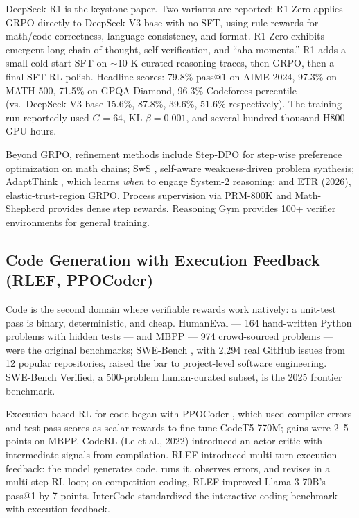 \documentclass{article}
\begin{document}
DeepSeek-R1 \citep{guo20252025} is the keystone paper. Two variants are reported: R1-Zero applies GRPO directly to DeepSeek-V3 base with no SFT, using rule rewards for math/code correctness, language-consistency, and format. R1-Zero exhibits emergent long chain-of-thought, self-verification, and ``aha moments.'' R1 adds a small cold-start SFT on $\sim$10 K curated reasoning traces, then GRPO, then a final SFT-RL polish. Headline scores: 79.8\% pass@1 on AIME 2024, 97.3\% on MATH-500, 71.5\% on GPQA-Diamond, 96.3\% Codeforces percentile (vs.~DeepSeek-V3-base 15.6\%, 87.8\%, 39.6\%, 51.6\% respectively). The training run reportedly used \(G = 64\), KL \(\beta = 0.001\), and several hundred thousand H800 GPU-hours.

Beyond GRPO, refinement methods include Step-DPO \citep{lai20242024} for step-wise preference optimization on math chains; SwS \citep{liang20252025}, self-aware weakness-driven problem synthesis; AdaptThink \citep{zhang20252025}, which learns \emph{when} to engage System-2 reasoning; and ETR (2026), elastic-trust-region GRPO. Process supervision via PRM-800K \citep{lightman2023letsverifystepbyst} and Math-Shepherd \citep{wang2024interpretableprefe} provides dense step rewards. Reasoning Gym \citep{stojanovski20252025} provides 100+ verifier environments for general training.

\subsection{Code Generation with Execution Feedback (RLEF, PPOCoder)}\label{code-generation-with-execution-feedback-rlef-ppocoder}

Code is the second domain where verifiable rewards work natively: a unit-test pass is binary, deterministic, and cheap. HumanEval \citep{chen20212021} --- 164 hand-written Python problems with hidden tests --- and MBPP \citep{austin2021programsynthesiswi} --- 974 crowd-sourced problems --- were the original benchmarks; SWE-Bench \citep{jimenez2024swebenchcanlanguag}, with 2,294 real GitHub issues from 12 popular repositories, raised the bar to project-level software engineering. SWE-Bench Verified, a 500-problem human-curated subset, is the 2025 frontier benchmark.

Execution-based RL for code began with PPOCoder \citep{shojaee2023executionbasedcode}, which used compiler errors and test-pass scores as scalar rewards to fine-tune CodeT5-770M; gains were 2--5 points on MBPP. CodeRL (Le et al., 2022) introduced an actor-critic with intermediate signals from compilation. RLEF \citep{gehring20242024} introduced multi-turn execution feedback: the model generates code, runs it, observes errors, and revises in a multi-step RL loop; on competition coding, RLEF improved Llama-3-70B's pass@1 by 7 points. InterCode \citep{yang20232023} standardized the interactive coding benchmark with execution feedback.
\end{document}
